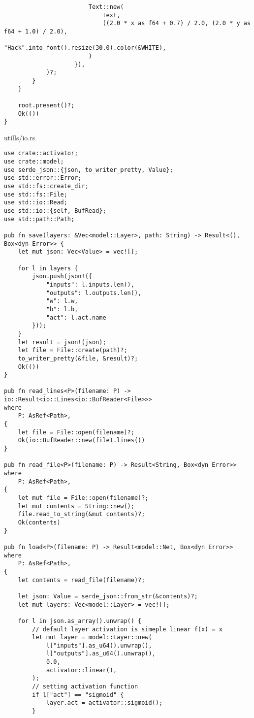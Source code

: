 \begin{verbatim}
                        Text::new(
                            text,
                            ((2.0 * x as f64 + 0.7) / 2.0, (2.0 * y as f64 + 1.0) / 2.0),
                            "Hack".into_font().resize(30.0).color(&WHITE),
                        )
                    }),
            )?;
        }
    }

    root.present()?;
    Ok(())
}

\end{verbatim}
\noindent utills/io.rs
\begin{verbatim}      
use crate::activator;
use crate::model;
use serde_json::{json, to_writer_pretty, Value};
use std::error::Error;
use std::fs::create_dir;
use std::fs::File;
use std::io::Read;
use std::io::{self, BufRead};
use std::path::Path;

pub fn save(layers: &Vec<model::Layer>, path: String) -> Result<(), Box<dyn Error>> {
    let mut json: Vec<Value> = vec![];

    for l in layers {
        json.push(json!({
            "inputs": l.inputs.len(),
            "outputs": l.outputs.len(),
            "w": l.w,
            "b": l.b,
            "act": l.act.name
        }));
    }
    let result = json!(json);
    let file = File::create(path)?;
    to_writer_pretty(&file, &result)?;
    Ok(())
}

pub fn read_lines<P>(filename: P) -> io::Result<io::Lines<io::BufReader<File>>>
where
    P: AsRef<Path>,
{
    let file = File::open(filename)?;
    Ok(io::BufReader::new(file).lines())
}

pub fn read_file<P>(filename: P) -> Result<String, Box<dyn Error>>
where
    P: AsRef<Path>,
{
    let mut file = File::open(filename)?;
    let mut contents = String::new();
    file.read_to_string(&mut contents)?;
    Ok(contents)
}

pub fn load<P>(filename: P) -> Result<model::Net, Box<dyn Error>>
where
    P: AsRef<Path>,
{
    let contents = read_file(filename)?;

    let json: Value = serde_json::from_str(&contents)?;
    let mut layers: Vec<model::Layer> = vec![];

    for l in json.as_array().unwrap() {
        // default layer activation is simeple linear f(x) = x
        let mut layer = model::Layer::new(
            l["inputs"].as_u64().unwrap(),
            l["outputs"].as_u64().unwrap(),
            0.0,
            activator::linear(),
        );
        // setting activation function
        if l["act"] == "sigmoid" {
            layer.act = activator::sigmoid();
        }


\end{verbatim}
